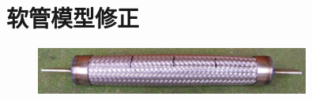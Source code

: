 
\chapter{软管模型修正}





\begin{figure}[!htbp]
	\centering

	\includegraphics[width=0.8\textwidth]{figure/chap3/hachemi/hachemi-specimen}
	\label{fig:hachemi-specimen}
\end{figure}